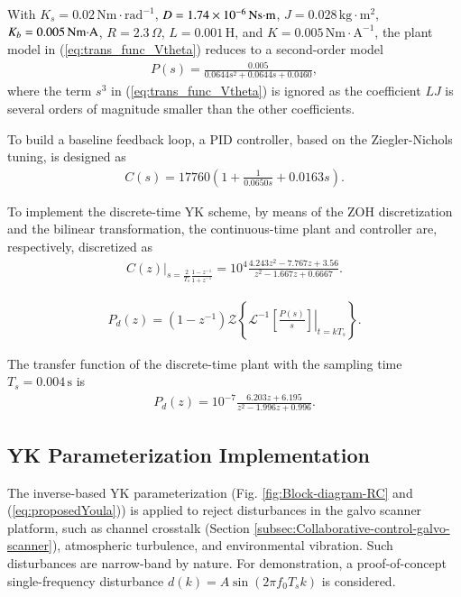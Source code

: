 \documentclass [11pt, proquest] {uwthesis}[2020/02/24]
\begin{document}
With $K_{s}=0.02\,$$\text{Nm}\cdot\text{rad}^{-1}$, $D=1.74\times10^{-6}\,\text{Ns\ensuremath{\cdotp}m}$,
$J=0.028\,$$\text{kg}\cdot\text{m}^{2}$, $K_{b}=0.005\,\text{Nm\ensuremath{\cdotp}A}$,
$R=2.3\,\Omega$, $L=0.001\,\text{H}$, and $K=0.005\,$$\text{Nm}\cdot\text{A}^{-1}$,
the plant model in (\ref{eq:trans_func_Vtheta}) reduces to a second-order
model \cite{keane1994full}
\begin{gather}
P(s)=\frac{0.005}{0.0644s^{2}+0.0644s+0.0460},\label{eq:second_order_plantmodel}
\end{gather}
where the term $s^{3}$ in (\ref{eq:trans_func_Vtheta}) is ignored
as the coefficient $LJ$ is several orders of magnitude smaller than
the other coefficients.

To build a baseline feedback loop, a PID controller, based on the
Ziegler-Nichols tuning, is designed as \cite{ziegler1942optimum}
\begin{gather}
C(s)=17760(1+\frac{1}{0.0650s}+0.0163s).\label{eq:PID controller}
\end{gather}

To implement the discrete-time YK scheme, by means of the ZOH discretization and the bilinear transformation, the continuous-time
plant and controller are, respectively, discretized as 
\begin{gather}
C(z)|_{s=\frac{2}{T_{s}}\frac{1-z^{-1}}{1+z^{-1}}}=10{}^{4}\frac{4.243z^{2}-7.767z+3.56}{z^{2}-1.667z+0.6667}.\label{eq:discrete_time_C}
\end{gather}

\begin{gather}
P_{d}(z)=(1-z^{-1})\mathcal{Z}\left\{ \mathcal{L}^{-1}\left.\left[\frac{P(s)}{s}\right]\right|_{t=kT_{s}}\right\} .\label{eq:zero_order-hold}
\end{gather}

The transfer function of the discrete-time plant with the sampling
time $T_{s}=0.004\,\text{s}$ is
\begin{gather}
P_{d}(z)=10^{-7}\frac{6.203z+6.195}{z^{2}-1.996z+0.996}.\label{eq:discrete_time_P}
\end{gather}

\subsection{YK Parameterization Implementation}

The inverse-based YK parameterization (Fig. \ref{fig:Block-diagram-RC}
and (\ref{eq:proposedYoula})) is applied to reject disturbances in
the galvo scanner platform, such as channel crosstalk (Section \ref{subsec:Collaborative-control-galvo-scanner}), atmospheric
turbulence, and environmental vibration. Such disturbances are narrow-band
by nature. For demonstration, a proof-of-concept single-frequency
disturbance $d(k)=A\sin(2\pi f_{0}T_{s}k)$ is considered. 
\end{document}
